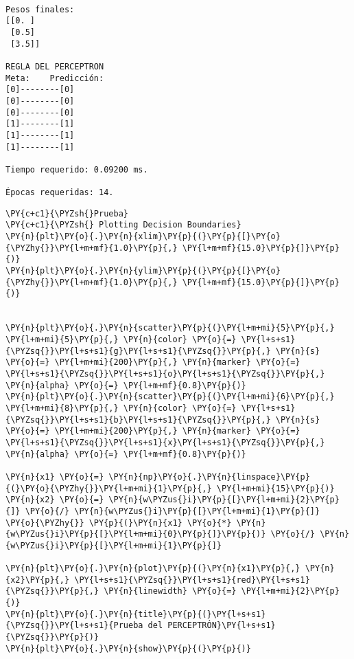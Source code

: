     \begin{Verbatim}[commandchars=\\\{\}]

Pesos finales:
[[0. ]
 [0.5]
 [3.5]]

REGLA DEL PERCEPTRON
Meta:    Predicción:
[0]--------[0]
[0]--------[0]
[0]--------[0]
[1]--------[1]
[1]--------[1]
[1]--------[1]

Tiempo requerido: 0.09200 ms.

Épocas requeridas: 14.
    \end{Verbatim}

    \begin{tcolorbox}[breakable, size=fbox, boxrule=1pt, pad at break*=1mm,colback=cellbackground, colframe=cellborder]
\begin{Verbatim}[commandchars=\\\{\}]
\PY{c+c1}{\PYZsh{}Prueba}
\PY{c+c1}{\PYZsh{} Plotting Decision Boundaries}
\PY{n}{plt}\PY{o}{.}\PY{n}{xlim}\PY{p}{(}\PY{p}{[}\PY{o}{\PYZhy{}}\PY{l+m+mf}{1.0}\PY{p}{,} \PY{l+m+mf}{15.0}\PY{p}{]}\PY{p}{)}
\PY{n}{plt}\PY{o}{.}\PY{n}{ylim}\PY{p}{(}\PY{p}{[}\PY{o}{\PYZhy{}}\PY{l+m+mf}{1.0}\PY{p}{,} \PY{l+m+mf}{15.0}\PY{p}{]}\PY{p}{)}


\PY{n}{plt}\PY{o}{.}\PY{n}{scatter}\PY{p}{(}\PY{l+m+mi}{5}\PY{p}{,} \PY{l+m+mi}{5}\PY{p}{,} \PY{n}{color} \PY{o}{=} \PY{l+s+s1}{\PYZsq{}}\PY{l+s+s1}{g}\PY{l+s+s1}{\PYZsq{}}\PY{p}{,} \PY{n}{s} \PY{o}{=} \PY{l+m+mi}{200}\PY{p}{,} \PY{n}{marker} \PY{o}{=} \PY{l+s+s1}{\PYZsq{}}\PY{l+s+s1}{o}\PY{l+s+s1}{\PYZsq{}}\PY{p}{,} \PY{n}{alpha} \PY{o}{=} \PY{l+m+mf}{0.8}\PY{p}{)}
\PY{n}{plt}\PY{o}{.}\PY{n}{scatter}\PY{p}{(}\PY{l+m+mi}{6}\PY{p}{,} \PY{l+m+mi}{8}\PY{p}{,} \PY{n}{color} \PY{o}{=} \PY{l+s+s1}{\PYZsq{}}\PY{l+s+s1}{b}\PY{l+s+s1}{\PYZsq{}}\PY{p}{,} \PY{n}{s} \PY{o}{=} \PY{l+m+mi}{200}\PY{p}{,} \PY{n}{marker} \PY{o}{=} \PY{l+s+s1}{\PYZsq{}}\PY{l+s+s1}{x}\PY{l+s+s1}{\PYZsq{}}\PY{p}{,} \PY{n}{alpha} \PY{o}{=} \PY{l+m+mf}{0.8}\PY{p}{)}

\PY{n}{x1} \PY{o}{=} \PY{n}{np}\PY{o}{.}\PY{n}{linspace}\PY{p}{(}\PY{o}{\PYZhy{}}\PY{l+m+mi}{1}\PY{p}{,} \PY{l+m+mi}{15}\PY{p}{)}
\PY{n}{x2} \PY{o}{=} \PY{n}{w\PYZus{}i}\PY{p}{[}\PY{l+m+mi}{2}\PY{p}{]} \PY{o}{/} \PY{n}{w\PYZus{}i}\PY{p}{[}\PY{l+m+mi}{1}\PY{p}{]} \PY{o}{\PYZhy{}} \PY{p}{(}\PY{n}{x1} \PY{o}{*} \PY{n}{w\PYZus{}i}\PY{p}{[}\PY{l+m+mi}{0}\PY{p}{]}\PY{p}{)} \PY{o}{/} \PY{n}{w\PYZus{}i}\PY{p}{[}\PY{l+m+mi}{1}\PY{p}{]}

\PY{n}{plt}\PY{o}{.}\PY{n}{plot}\PY{p}{(}\PY{n}{x1}\PY{p}{,} \PY{n}{x2}\PY{p}{,} \PY{l+s+s1}{\PYZsq{}}\PY{l+s+s1}{red}\PY{l+s+s1}{\PYZsq{}}\PY{p}{,} \PY{n}{linewidth} \PY{o}{=} \PY{l+m+mi}{2}\PY{p}{)}
\PY{n}{plt}\PY{o}{.}\PY{n}{title}\PY{p}{(}\PY{l+s+s1}{\PYZsq{}}\PY{l+s+s1}{Prueba del PERCEPTRÓN}\PY{l+s+s1}{\PYZsq{}}\PY{p}{)}
\PY{n}{plt}\PY{o}{.}\PY{n}{show}\PY{p}{(}\PY{p}{)}
\end{Verbatim}
\end{tcolorbox}

    \begin{center}
    \end{center}
    { \hspace*{\fill} \\}
    

